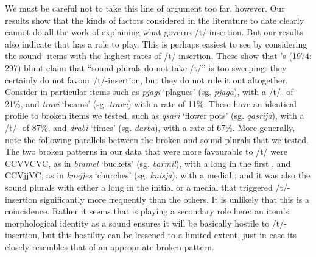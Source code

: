 \documentclass[output=paper]{langsci/langscibook}
\begin{document}
We must be careful not to take this line of argument too far, however. Our results show that the kinds of  factors considered in the literature to date clearly cannot do all the work of explaining what governs /t/-insertion. But our results also indicate that  has a role to play. This is perhaps easiest to see by considering the sound- items with the highest rates of /t/-insertion. These show that \citeauthor{Borg1974}’s (1974: 297) blunt claim that “sound plurals do not take /t/” is too sweeping: they certainly do not favour /t/-insertion, but they do not rule it out altogether. Consider in particular items such as \textit{pjagi} ‘plagues’ (sg. \textit{pjaga}), with a /t/- of 21\%, and \textit{travi} ‘beams’ (sg. \textit{travu}) with a rate of 11\%. These have an identical  profile to broken  items we tested, such as \textit{qsari} ‘flower pots’ (sg. \textit{qasrija}), with a /t/- of 87\%, and \textit{drabi} ‘times’ (sg. \textit{darba}), with a rate of 67\%. More generally, note the following parallels between the broken and sound plurals that we tested. The two broken  patterns in our data that were more favourable to /t/ were CCVVCVC, as in \textit{bramel} ‘buckets’ (sg. \textit{barmil}), with a long  in the first , and CCVjjVC, as in \textit{knejjes} ‘churches’ (sg. \textit{knisja}), with a medial ; and it was also the sound plurals with either a long  in the initial  or a medial  that triggered /t/-insertion significantly more frequently than the others. It is unlikely that this is a coincidence. Rather it seems that  is playing a secondary role here: an item’s morphological identity as a sound  ensures it will be basically hostile to /t/-insertion, but this hostility can be lessened to a limited extent, just in case its  closely resembles that of an appropriate broken  pattern.
\end{document}
